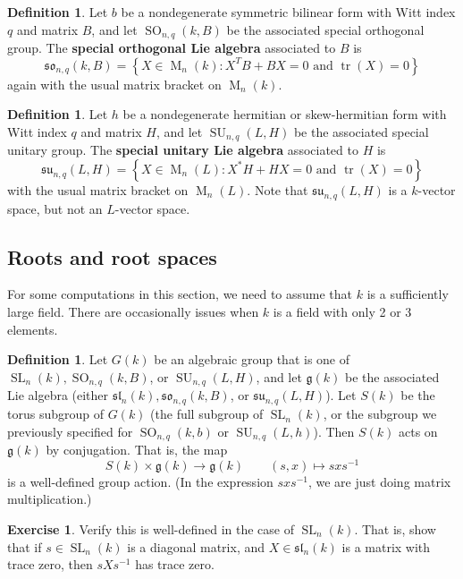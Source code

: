 \documentclass[12pt]{article}
\theoremstyle{definition}
\newtheorem{definition}[theorem]{Definition}
\newtheorem{exercise}[theorem]{Exercise}
\newcommand{\lb}{\left\{}
\newcommand{\rb}{\right\}}
\newcommand{\tbf}{\textbf}
\newcommand{\inv}{^{-1}}
\newcommand{\frakg}{\mathfrak{g}}
\newcommand{\fraksl}{\mathfrak{sl}}
\DeclareMathOperator{\M}{M}
\DeclareMathOperator{\SL}{SL}
\DeclareMathOperator{\SU}{SU}
\DeclareMathOperator{\SO}{SO}
\DeclareMathOperator{\tr}{tr}
\begin{document}
\begin{definition}
Let $b$ be a nondegenerate symmetric bilinear form with Witt index $q$ and matrix $B$, and let $\SO_{n,q}(k,B)$ be the associated special orthogonal group. The \tbf{special orthogonal Lie algebra} associated to $B$ is
\[
	\mathfrak{so}_{n,q}(k,B) = \lb X \in \M_n(k) : X^TB + BX = 0 \text{ and } \tr(X) = 0 \rb
\]
again with the usual matrix bracket on $\M_n(k)$.
\end{definition}

\begin{definition}
Let $h$ be a nondegenerate hermitian or skew-hermitian form with Witt index $q$ and matrix $H$, and let $\SU_{n,q}(L,H)$ be the associated special unitary group. The \tbf{special unitary Lie algebra} associated to $H$ is
\[
	\mathfrak{su}_{n,q}(L,H) = \lb X \in \M_n(L) : X^* H + HX = 0 \text{ and } \tr(X) = 0 \rb
\]
with the usual matrix bracket on $\M_n(L)$. Note that $\mathfrak{su}_{n,q}(L,H)$ is a $k$-vector space, but not an $L$-vector space.
\end{definition}

\subsection{Roots and root spaces}

For some computations in this section, we need to assume that $k$ is a sufficiently large field. There are occasionally issues when $k$ is a field with only 2 or 3 elements.

\begin{definition}
Let $G(k)$ be an algebraic group that is one of $\SL_n(k), \SO_{n,q}(k,B)$, or $\SU_{n,q}(L,H)$, and let $\frakg(k)$ be the associated Lie algebra (either $\mathfrak{sl}_n(k), \mathfrak{so}_{n,q}(k,B)$, or $\mathfrak{su}_{n,q}(L,H)$). Let $S(k)$ be the torus subgroup of $G(k)$ (the full subgroup of $\SL_n(k)$, or the subgroup we previously specified for $\SO_{n,q}(k,b)$ or $\SU_{n,q}(L,h)$). Then $S(k)$ acts on $\frakg(k)$ by conjugation. That is, the map
\[
	S(k) \times \frakg(k) \to \frakg(k) \qquad (s,x) \mapsto sxs \inv
\]
is a well-defined group action. (In the expression $sxs \inv$, we are just doing matrix multiplication.)
\end{definition}

\begin{exercise}
Verify this is well-defined in the case of $\SL_n(k)$. That is, show that if $s \in \SL_n(k)$ is a diagonal matrix, and $X \in \fraksl_n(k)$ is a matrix with trace zero, then $sXs \inv$ has trace zero.
\end{exercise}
\end{document}
